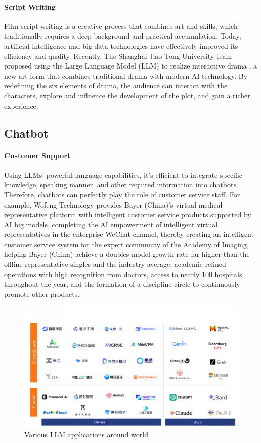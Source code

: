 \documentclass[fleqn,10pt]{SelfArx} %
\begin{document}
\paragraph{Script Writing} Film script writing is a creative process that combines art and skills, which traditionally requires a deep background and practical accumulation. Today, artificial intelligence and big data technologies have effectively improved its efficiency and quality. Recently, The Shanghai Jiao Tong University team proposed using the Large Language Model (LLM) to realize interactive drama \cite{wu2024roleplay}, a new art form that combines traditional drama with modern AI technology. By redefining the six elements of drama, the audience can interact with the characters, explore and influence the development of the plot, and gain a richer experience.




\subsection{Chatbot}

\paragraph{Customer Support} Using LLMs' powerful language capabilities, it's efficient to integrate specific knowledge, speaking manner, and other required information into chatbots. Therefore, chatbots can perfectly play the role of customer service staff. For example, Wofeng Technology provides Bayer (China)'s virtual medical representative platform with intelligent customer service products supported by AI big models, completing the AI empowerment of intelligent virtual representatives in the enterprise WeChat channel, thereby creating an intelligent customer service system for the expert community of the Academy of Imaging, helping Bayer (China) achieve a doubles model growth rate far higher than the offline representative singles and the industry average, academic refined operations with high recognition from doctors, access to nearly 100 hospitals throughout the year, and the formation of a discipline circle to continuously promote other products.

\begin{figure}[ht]\centering
	\includegraphics[width=\linewidth]{Figures/LLMs.png}
	\caption{Various LLM applications around world}
	\label{fig:llmapp}
\end{figure}
\end{document}
